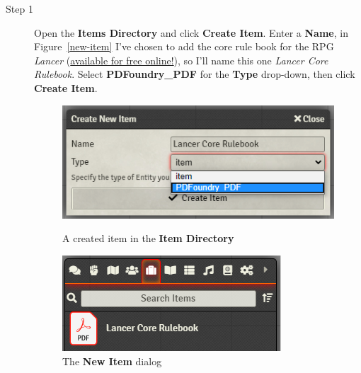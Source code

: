 \documentclass{article}
\begin{document}
    \begin{description}
        \item [Step 1] Open the \textbf{Items Directory} and click \textbf{Create Item}. Enter a \textbf{Name}, in Figure~\ref{new-item} I've chosen to add the core rule book for the RPG \textit{Lancer} (\href{https://massif-press.itch.io/corebook-pdf-free}{available for free online!}), so I'll name this one \textit{Lancer Core Rulebook}. Select \textbf{PDFoundry\_PDF} for the \textbf{Type} drop-down, then click \textbf{Create Item}.

        \begin{figure}[h]
            \centering
            \begin{minipage}[t]{0.45\textwidth}
                \centering
                \includegraphics[width=\textwidth]{images/new-item.png}
                \caption{A created item in the \textbf{Item Directory}}
                \label{new-item}
            \end{minipage}
            \hfill
            \begin{minipage}[t]{0.45\textwidth}
                \centering
                \includegraphics[width=\textwidth]{images/new-item-created.png}
                \caption{The \textbf{New Item} dialog}

                \label{new-item-created}
            \end{minipage}
        \end{figure}


\end{description}
\end{document}
